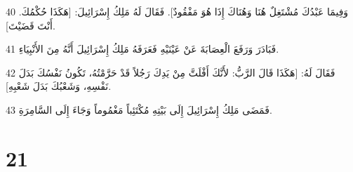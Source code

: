 \par 40 وَفِيمَا عَبْدُكَ مُشْتَغِلٌ هُنَا وَهُنَاكَ إِذَا هُوَ مَفْقُودٌ]. فَقَالَ لَهُ مَلِكُ إِسْرَائِيلَ: [هَكَذَا حُكْمُكَ. أَنْتَ قَضَيْتَ].
\par 41 فَبَادَرَ وَرَفَعَ الْعِصَابَةَ عَنْ عَيْنَيْهِ فَعَرَفَهُ مَلِكُ إِسْرَائِيلَ أَنَّهُ مِنَ الأَنْبِيَاءِ.
\par 42 فَقَالَ لَهُ: [هَكَذَا قَالَ الرَّبُّ: لأَنَّكَ أَفْلَتَّ مِنْ يَدِكَ رَجُلاً قَدْ حَرَّمْتُهُ، تَكُونُ نَفْسُكَ بَدَلَ نَفْسِهِ، وَشَعْبُكَ بَدَلَ شَعْبِهِ].
\par 43 فَمَضَى مَلِكُ إِسْرَائِيلَ إِلَى بَيْتِهِ مُكْتَئِباً مَغْمُوماً وَجَاءَ إِلَى السَّامِرَةِ.

\chapter{21}

